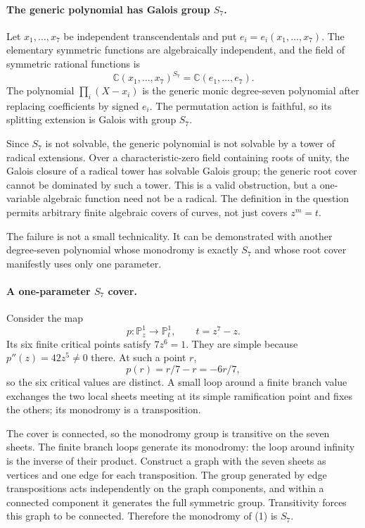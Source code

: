 \documentclass[11pt]{article}
\begin{document}
\paragraph{The generic polynomial has Galois group $S_7$.}
Let $x_1,\ldots,x_7$ be independent transcendentals and put $e_i=e_i(x_1,\ldots,x_7)$. The elementary symmetric functions are algebraically independent, and the field of symmetric rational functions is
\[
 \mathbb C(x_1,\ldots,x_7)^{S_7}
   =\mathbb C(e_1,\ldots,e_7).
\]
The polynomial $\prod_i(X-x_i)$ is the generic monic degree-seven polynomial after replacing coefficients by signed $e_i$. The permutation action is faithful, so its splitting extension is Galois with group $S_7$.

Since $S_7$ is not solvable, the generic polynomial is not solvable by a tower of radical extensions. Over a characteristic-zero field containing roots of unity, the Galois closure of a radical tower has solvable Galois group; the generic root cover cannot be dominated by such a tower. This is a valid obstruction, but a one-variable algebraic function need not be a radical. The definition in the question permits arbitrary finite algebraic covers of curves, not just covers $z^m=t$.

The failure is not a small technicality. It can be demonstrated with another degree-seven polynomial whose monodromy is exactly $S_7$ and whose root cover manifestly uses only one parameter.

\paragraph{A one-parameter $S_7$ cover.}
Consider the map
\[
 p:\mathbb P^1_z\longrightarrow\mathbb P^1_t,
 \qquad t=z^7-z.                                           \tag{1}
\]
Its six finite critical points satisfy $7z^6=1$. They are simple because $p''(z)=42z^5\ne0$ there. At such a point $r$,
\[
 p(r)=r/7-r=-6r/7,
\]
so the six critical values are distinct. A small loop around a finite branch value exchanges the two local sheets meeting at its simple ramification point and fixes the others; its monodromy is a transposition.

The cover is connected, so the monodromy group is transitive on the seven sheets. The finite branch loops generate its monodromy: the loop around infinity is the inverse of their product. Construct a graph with the seven sheets as vertices and one edge for each transposition. The group generated by edge transpositions acts independently on the graph components, and within a connected component it generates the full symmetric group. Transitivity forces this graph to be connected. Therefore the monodromy of (1) is $S_7$.
\end{document}
